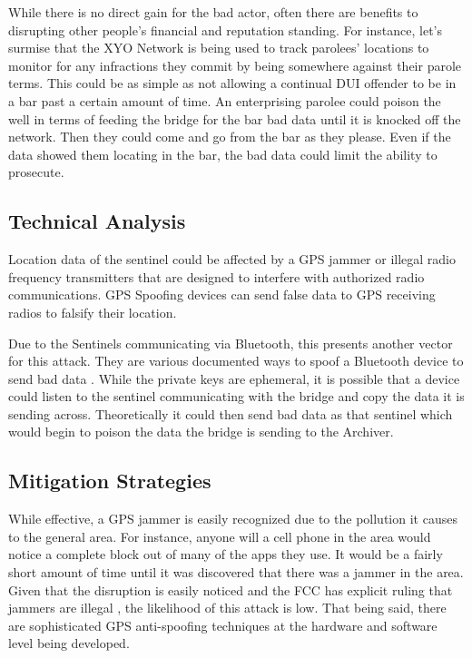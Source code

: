 \documentclass{article}
\begin{document}
While there is no direct gain for the bad actor, often there are benefits to disrupting other people's financial and reputation standing. For instance, let's surmise that the XYO Network is being used to track parolees' locations to monitor for any infractions they commit by being somewhere against their parole terms. This could be as simple as not allowing a continual DUI offender to be in a bar past a certain amount of time. An enterprising parolee could poison the well in terms of feeding the bridge for the bar bad data until it is knocked off the network. Then they could come and go from the bar as they please. Even if the data showed them locating in the bar, the bad data could limit the ability to prosecute.

\subsection{Technical Analysis}
Location data of the sentinel could be affected by a GPS jammer or illegal radio frequency transmitters that are designed to interfere with authorized radio communications. GPS Spoofing devices \cite{gps1} can send false data to GPS receiving radios to falsify their location. 

Due to the Sentinels communicating via Bluetooth, this presents another vector for this attack. They are various documented ways to spoof a Bluetooth device to send bad data \cite{bluetooth1}. While the private keys are ephemeral, it is possible that a device could listen to the sentinel communicating with the bridge and copy the data it is sending across. Theoretically it could then send bad data as that sentinel which would begin to poison the data the bridge is sending to the Archiver. 

\subsection{Mitigation Strategies}
While effective, a GPS jammer is easily recognized due to the pollution it causes to the general area. For instance, anyone will a cell phone in the area would notice a complete block out of many of the apps they use. It would be a fairly short amount of time until it was discovered that there was a jammer in the area. Given that the disruption is easily noticed and the FCC has explicit ruling that jammers are illegal \cite{fcc1}, the likelihood of this attack is low. That being said, there are sophisticated GPS anti-spoofing techniques at the hardware and software level being developed. \cite{gps1}
\end{document}
